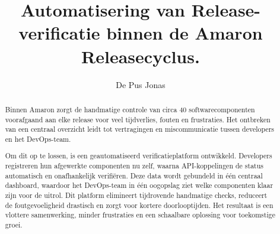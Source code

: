 \documentclass[a0,portrait]{hogent-poster}
\title{Automatisering van Release-verificatie binnen de Amaron Releasecyclus.}
\author{De Pus Jonas}
\begin{document}
\raggedbottom 

\maketitle

\begin{abstract}
Binnen Amaron zorgt de handmatige controle van circa 40 softwarecomponenten voorafgaand aan elke release voor veel tijdverlies, fouten en frustraties. Het ontbreken van een centraal overzicht leidt tot vertragingen en miscommunicatie tussen developers en het DevOps-team.

Om dit op te lossen, is een geautomatiseerd verificatieplatform ontwikkeld. Developers registreren hun afgewerkte componenten nu zelf, waarna API-koppelingen de status automatisch en onafhankelijk verifiëren. Deze data wordt gebundeld in één centraal dashboard, waardoor het DevOps-team in één oogopslag ziet welke componenten klaar zijn voor de uitrol. Dit platform elimineert tijdrovende handmatige checks, reduceert de foutgevoeligheid drastisch en zorgt voor kortere doorlooptijden. Het resultaat is een vlottere samenwerking, minder frustraties en een schaalbare oplossing voor toekomstige groei.
\end{abstract}
\end{document}

